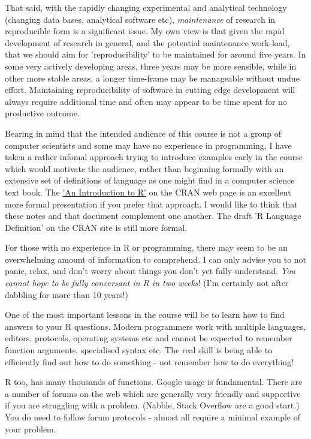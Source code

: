 \documentclass[titlepage]{book}\usepackage{knitr}
\begin{document}
That said, with the rapidly changing experimental and analytical technology (changing data bases, analytical software etc), \emph{maintenance} of research in reproducible form is a significant issue.  My own view is that given the rapid development of research in general, and the potential maintenance work-load, that we should aim for 'reproducibility' to be maintained for around five years. In some very actively developing areas, three years may be more sensible, while in other more stable areas, a longer time-frame may be manageable without undue effort.  Maintaining reproducibility of software in cutting edge development will always require additional time and often may appear to be time spent for no productive outcome.

Bearing in mind that the intended audience of this course is not a group of computer scientists and some may have no experience in programming, I have taken a rather infomal approach trying to introduce examples early in the course which would motivate the audience, rather than beginning formally with an extensive set of definitions of language as one might find in a computer science text book. The \href{https://cran.r-project.org/doc/manuals/r-release/R-intro.pdf}{'An Introduction to R'} on the CRAN web page is an excellent more formal presentation if you prefer that approach.  I would like to think that these notes and that document complement one another. The draft 'R Language Definition' on the CRAN site is still more formal.

For those with no experience in R or programming, there may seem to be an overwhelming amount of information to comprehend. I can only advise you to not panic, relax, and don't worry about things you don't yet fully understand.  \emph{You cannot hope to be fully conversant in R in two weeks}! (I'm certainly not after dabbling for more than 10 years!) 

One of the most important lessons in the course will be to learn how to find answers to your R questions. Modern programmers work with multiple languages, editors, protocols, operating systems etc and cannot be expected to remember function arguments, specialised syntax etc. The real skill is being able to efficiently find out how to do something -  not remember how to do everything!

R too, has many thousands of functions.  Google usage is fundamental. There are a number of forums on the web which are generally very friendly and supportive if you are struggling with a problem. (Nabble, Stack Overflow are a good start.) You do need to follow forum protocols - almost all require a minimal example of your problem.
\end{document}
